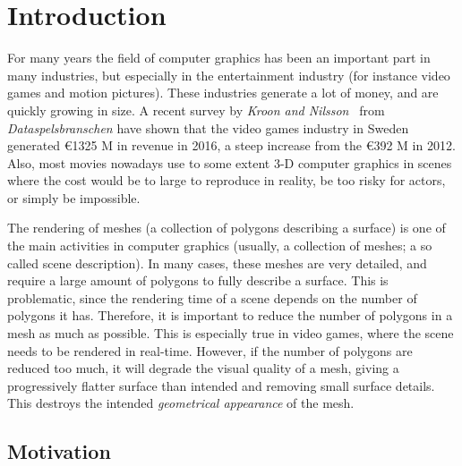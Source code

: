 

\chapter{Introduction}
\label{cha:introduction}

For many years the field of computer graphics has been an important part in many industries, but especially in the entertainment industry (for instance video games and motion pictures). These industries generate a lot of money, and are quickly growing in size. A recent survey by \emph{Kroon and Nilsson}~\cite{kroon2017game} from \emph{Dataspelsbranschen} have shown that the video games industry in Sweden generated \euro 1325 M in revenue in 2016, a steep increase from the \euro 392 M in 2012. Also, most movies nowadays use to some extent 3-D computer graphics in scenes where the cost would be to large to reproduce in reality, be too risky for actors, or simply be impossible.

The rendering of meshes (a collection of polygons describing a surface) is one of the main activities in computer graphics (usually, a collection of meshes; a so called scene description). In many cases, these meshes are very detailed, and require a large amount of polygons to fully describe a surface. This is problematic, since the rendering time of a scene depends on the number of polygons it has. Therefore, it is important to reduce the number of polygons in a mesh as much as possible. This is especially true in video games, where the scene needs to be rendered in real-time. However, if the number of polygons are reduced too much, it will degrade the visual quality of a mesh, giving a progressively flatter surface than intended and removing small surface details. This destroys the intended \emph{geometrical appearance} of the mesh.

\section{Motivation}
\label{sec:motivation}


